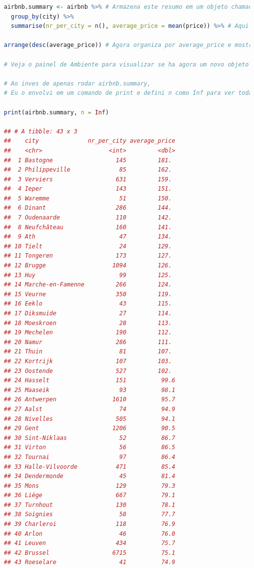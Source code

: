 \documentclass{article}
\begin{document}
\begin{lstlisting}[language=R]
airbnb.summary <- airbnb %>% # Armazena este resumo em um objeto chamado airbnb.summary.
  group_by(city) %>%
  summarise(nr_per_city = n(), average_price = mean(price)) %>% # Aqui informamos ao R para criar outra variavel chamada average_price que nos fornece a media dos precos por grupo (city)
  
arrange(desc(average_price)) # Agora organiza por average_price e mostra o maior preco praticado dentre os demais

# Veja o painel de Ambiente para visualizar se ha agora um novo objeto chamado airbnb.summary.

# Ao inves de apenas rodar airbnb.summary, 
# Eu o envolvi em um comando de print e defini n como Inf para ver todas as linhas.

print(airbnb.summary, n = Inf) 

## # A tibble: 43 x 3
##    city              nr_per_city average_price
##    <chr>                   <int>         <dbl>
##  1 Bastogne                  145         181. 
##  2 Philippeville              85         162. 
##  3 Verviers                  631         159. 
##  4 Ieper                     143         151. 
##  5 Waremme                    51         150. 
##  6 Dinant                    286         144. 
##  7 Oudenaarde                110         142. 
##  8 Neufchâteau               160         141. 
##  9 Ath                        47         134. 
## 10 Tielt                      24         129. 
## 11 Tongeren                  173         127. 
## 12 Brugge                   1094         126. 
## 13 Huy                        99         125. 
## 14 Marche-en-Famenne         266         124. 
## 15 Veurne                    350         119. 
## 16 Eeklo                      43         115. 
## 17 Diksmuide                  27         114. 
## 18 Moeskroen                  28         113. 
## 19 Mechelen                  190         112. 
## 20 Namur                     286         111. 
## 21 Thuin                      81         107. 
## 22 Kortrijk                  107         103. 
## 23 Oostende                  527         102. 
## 24 Hasselt                   151          99.6
## 25 Maaseik                    93          98.1
## 26 Antwerpen                1610          95.7
## 27 Aalst                      74          94.9
## 28 Nivelles                  505          94.1
## 29 Gent                     1206          90.5
## 30 Sint-Niklaas               52          86.7
## 31 Virton                     56          86.5
## 32 Tournai                    97          86.4
## 33 Halle-Vilvoorde           471          85.4
## 34 Dendermonde                45          81.4
## 35 Mons                      129          79.3
## 36 Liège                     667          79.1
## 37 Turnhout                  130          78.1
## 38 Soignies                   58          77.7
## 39 Charleroi                 118          76.9
## 40 Arlon                      46          76.0
## 41 Leuven                    434          75.7
## 42 Brussel                  6715          75.1
## 43 Roeselare                  41          74.9
\end{lstlisting}
\end{document}
